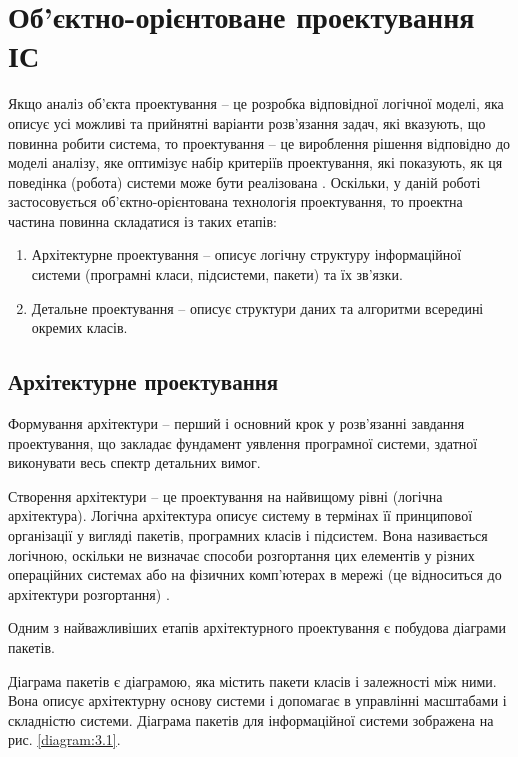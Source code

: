 \documentclass[../main.tex]{subfiles}
\begin{document}
\chapter{Об’єктно-орієнтоване проектування ІС}

Якщо аналіз об’єкта проектування – це розробка відповідної логічної моделі, яка описує усі можливі та прийнятні варіанти розв’язання задач, які вказують, що повинна робити система, то проектування – це вироблення рішення відповідно до моделі аналізу, яке оптимізує набір критеріїв проектування, які  показують, як ця поведінка (робота) системи може бути реалізована \cite{diploma_guidelines}.
Оскільки, у даній роботі застосовується об’єктно-орієнтована технологія проектування, то проектна частина повинна складатися із таких етапів:

\begin{enumerate}
	\item Архітектурне проектування – описує логічну структуру інформаційної системи (програмні класи, підсистеми,  пакети) та їх зв’язки.
	\item Детальне проектування – описує структури даних та алгоритми всередині окремих класів. 
\end{enumerate}

\section{Архітектурне проектування}
Формування архітектури – перший і основний крок у розв’язанні завдання проектування, що закладає фундамент уявлення програмної системи, здатної виконувати весь спектр детальних вимог. \cite{diploma_guidelines2}

Створення архітектури – це проектування на найвищому рівні (логічна архітектура). Логічна архітектура описує систему в термінах її принципової організації у вигляді пакетів, програмних класів і підсистем. Вона називається логічною, оскільки не визначає способи розгортання цих елементів у різних операційних системах або на фізичних комп’ютерах в мережі (це відноситься до архітектури розгортання) \cite{diploma_guidelines}.

Одним з найважливіших етапів архітектурного проектування є побудова діаграми пакетів. 

Діаграма пакетів є діаграмою, яка містить пакети класів і залежності між ними. Вона описує архітектурну основу системи і допомагає в управлінні масштабами і складністю системи. Діаграма пакетів для інформаційної системи зображена на рис. \ref{diagram:3.1}.
\vspace{\baselineskip}
\end{document}
